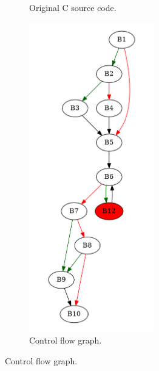 \begin{figure}[htbp]
	\centering
	\begin{subfigure}[b]{0.30\textwidth}
		\centering
		
		\caption{Original C source code.}
	\end{subfigure}
	\begin{subfigure}[b]{0.50\textwidth}
		\centering
		\includegraphics[width=0.6\textwidth]{inc/appendices/examples/hammock/counter-example/jump-threading-and-short-circuit/jump-threading-and-short-circuit_jump/f_0002b.png}
		\caption{Control flow graph.}
	\end{subfigure}
\end{figure}


